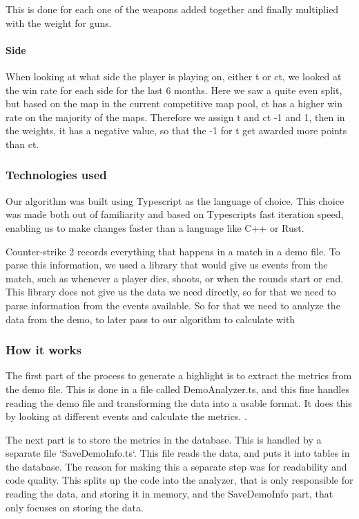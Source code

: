 This is done for each one of the weapons added together and finally multiplied with the weight for guns.


\paragraph{Side}
When looking at what side the player is playing on, either \acrshort{t} or \acrshort{ct}, we looked at the win rate for each side for the last 6 months\cite{hltvMapStats}. Here we saw a quite even split, but based on the map in the current competitive map pool, \acrshort{ct} has a higher win rate on the majority of the maps. Therefore we assign \acrshort{t} and \acrshort{ct} -1 and 1, then in the weights, it has a negative value, so that the -1 for \acrshort{t} get awarded more points than \acrshort{ct}.


\subsubsection{Technologies used}
Our algorithm was built using Typescript as the language of choice. This choice was made both out of familiarity and based on Typescripts fast iteration speed, enabling us to make changes faster than a language like C++ or Rust.

Counter-strike 2 records everything that happens in a match in a \Gls{demo} file. To parse this information, we used a library\cite{demoparser} that would give us events from the match, such as whenever a player dies, shoots, or when the rounds start or end. This library does not give us the data we need directly, so for that we need to parse information from the events available. So for that we need to analyze the data from the demo, to later pass to our algorithm to calculate with 
\subsubsection{How it works}
The first part of the process to generate a highlight is to extract the metrics from the demo file. This is done in a file called DemoAnalyzer.ts, and this fine handles reading the \Gls{demo} file and transforming the data into a usable format. It does this by looking at different events  and calculate the metrics. .

The next part is to store the metrics in the database. This is handled by a separate file `SaveDemoInfo.ts`. This file reads the data, and puts it into tables in the database. The reason for making this a separate step was for readability and code quality. This splits up the code into the analyzer, that is only responsible for reading the data, and storing it in memory, and the SaveDemoInfo part, that only focuses on storing the data. 

